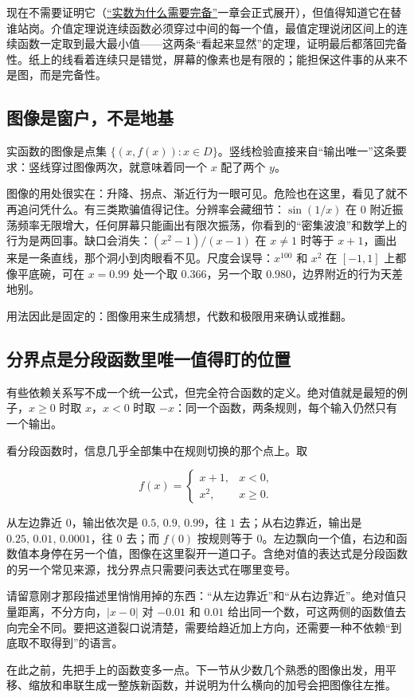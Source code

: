 现在不需要证明它（\hyperref[ch:097]{``实数为什么需要完备''}一章会正式展开），但值得知道它在替谁站岗。介值定理说连续函数必须穿过中间的每一个值，最值定理说闭区间上的连续函数一定取到最大最小值——这两条``看起来显然''的定理，证明最后都落回完备性。纸上的线看着连续只是错觉，屏幕的像素也是有限的；能担保这件事的从来不是图，而是完备性。

\subsection{图像是窗户，不是地基}

实函数的图像是点集 \(\{(x,f(x)):x\in D\}\)。竖线检验直接来自``输出唯一''这条要求：竖线穿过图像两次，就意味着同一个 \(x\) 配了两个 \(y\)。

图像的用处很实在：升降、拐点、渐近行为一眼可见。危险也在这里，看见了就不再追问凭什么。有三类欺骗值得记住。分辨率会藏细节：\(\sin(1/x)\) 在 \(0\) 附近振荡频率无限增大，任何屏幕只能画出有限次振荡，你看到的``密集波浪''和数学上的行为是两回事。缺口会消失：\((x^2-1)/(x-1)\) 在 \(x\neq1\) 时等于 \(x+1\)，画出来是一条直线，那个洞小到肉眼看不见。尺度会误导：\(x^{100}\) 和 \(x^2\) 在 \([-1,1]\) 上都像平底碗，可在 \(x=0.99\) 处一个取 \(0.366\)，另一个取 \(0.980\)，边界附近的行为天差地别。

用法因此是固定的：图像用来生成猜想，代数和极限用来确认或推翻。

\subsection{分界点是分段函数里唯一值得盯的位置}

有些依赖关系写不成一个统一公式，但完全符合函数的定义。绝对值就是最短的例子，\(x\ge0\) 时取 \(x\)，\(x<0\) 时取 \(-x\)：同一个函数，两条规则，每个输入仍然只有一个输出。

看分段函数时，信息几乎全部集中在规则切换的那个点上。取

\[
f(x)=
\begin{cases}
x+1, & x<0,\\[4pt]
x^2, & x\ge 0.
\end{cases}
\]

从左边靠近 \(0\)，输出依次是 \(0.5,\,0.9,\,0.99\)，往 \(1\) 去；从右边靠近，输出是 \(0.25,\,0.01,\,0.0001\)，往 \(0\) 去；而 \(f(0)\) 按规则等于 \(0\)。左边飘向一个值，右边和函数值本身停在另一个值，图像在这里裂开一道口子。含绝对值的表达式是分段函数的另一个常见来源，找分界点只需要问表达式在哪里变号。

请留意刚才那段描述里悄悄用掉的东西：``从左边靠近''和``从右边靠近''。绝对值只量距离，不分方向，\(|x-0|\) 对 \(-0.01\) 和 \(0.01\) 给出同一个数，可这两侧的函数值去向完全不同。要把这道裂口说清楚，需要给趋近加上方向，还需要一种不依赖``到底取不取得到''的语言。

在此之前，先把手上的函数变多一点。下一节从少数几个熟悉的图像出发，用平移、缩放和串联生成一整族新函数，并说明为什么横向的加号会把图像往左推。
